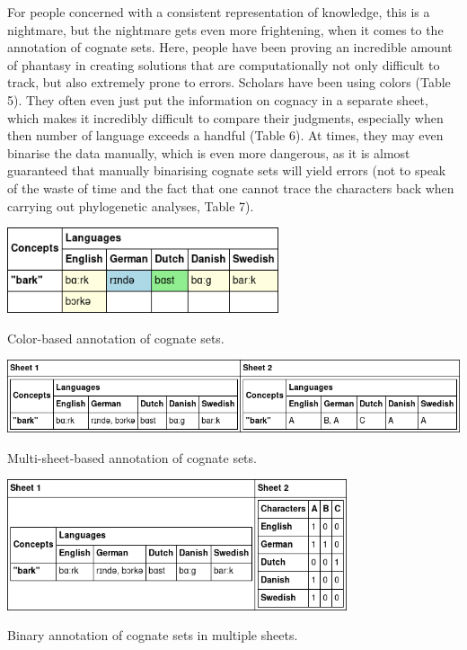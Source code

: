 \documentclass[a4paper,svgnames]{scrartcl}
\begin{document}
For people concerned with a consistent representation of knowledge, this
is a nightmare, but the nightmare gets even more frightening, when it
comes to the annotation of cognate sets. Here, people have been proving
an incredible amount of phantasy in creating solutions that are
computationally not only difficult to track, but also extremely prone to
errors. Scholars have been using colors (Table 5).
They often even just put the information on cognacy in a separate sheet,
which makes it incredibly difficult to compare their judgments,
especially when then number of language exceeds a handful (Table 6).
At times, they may even binarise the data manually, which is even more
dangerous, as it is almost guaranteed that manually binarising cognate
sets will yield errors (not to speak of the waste of time and the fact
that one cannot trace the characters back when carrying out phylogenetic
analyses, Table 7).


\begin{table}
\centering
\includegraphics[width=8cm]{images/table-5.png}
\caption{Color-based annotation of cognate sets.}
\end{table}


\begin{table}
\centering
\includegraphics[width=\textwidth]{images/table-6.png}
\caption{Multi-sheet-based annotation of cognate sets.}
\end{table}


\begin{table}
\centering
\includegraphics[width=0.75\textwidth]{images/table-7.png}
\caption{Binary annotation of cognate sets in multiple sheets.}
\end{table}
\end{document}
